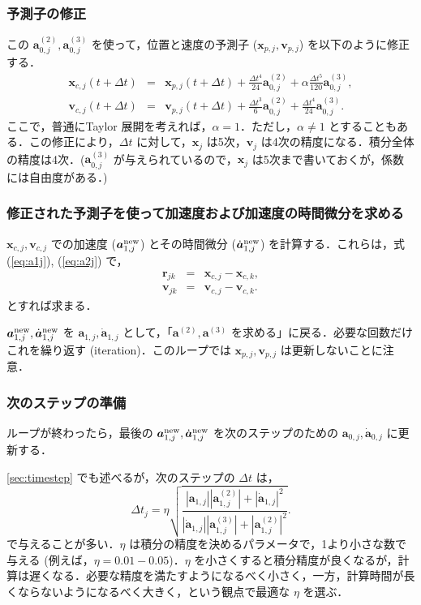 \documentclass[11pt,a4paper,oneside,onecolumn]{jreport}
\begin{document}
\subsubsection{予測子の修正}
この ${\bm a}_{0,j}^{(2)}, {\bm a}_{0,j}^{(3)}$ を使って，位置と速度の予測子 (${\bm x}_{p,j}, {\bm v}_{p,j}$) を以下のように修正する．
\begin{eqnarray}
{\bm x}_{c,j} (t + \Delta t) & = & {\bm x}_{p,j} (t + \Delta t) +  \frac{\Delta t ^4}{24} {\bm a}_{0,j}^{(2)} + \alpha \frac{\Delta t ^5}{120} {\bm a}_{0,j}^{(3)}, \\
{\bm v}_{c,j} (t + \Delta t) & = & {\bm v}_{p,j} (t +\Delta t) + \frac{\Delta t ^3}{6} {\bm a}_{0,j}^{(2)} + \frac{\Delta t ^4}{24} {\bm a}_{0,j}^{(3)}. 
\end{eqnarray}
ここで，普通にTaylor 展開を考えれば，$\alpha = 1$．ただし，$\alpha \not= 1$ とすることもある．この修正により，$\Delta t$ に対して，${\bm x}_j$ は5次，${\bm v}_j$ は4次の精度になる．積分全体の精度は4次．(${\bm a}_{0,j}^{(3)}$ が与えられているので，${\bm x}_j$ は5次まで書いておくが，係数には自由度がある．)

\subsubsection{修正された予測子を使って加速度および加速度の時間微分を求める}
${\bm x}_{c,j}, {\bm v}_{c,j}$ での加速度 (${\bm a}_{1,j}^{\rm new}$) とその時間微分 ($\dot{{\bm a}}_{1,j}^{\rm new}$) を計算する．これらは，式 (\ref{eq:a1j}), (\ref{eq:a2j}) で，
\begin{eqnarray}
{\bm r}_{jk} & = & {\bm x}_{c,j} - {\bm x}_{c,k}, \\
{\bm v}_{jk} & = & {\bm v}_{c,j} - {\bm v}_{c,k}. 
\end{eqnarray}
とすれば求まる．

${\bm a}_{1,j}^{\rm new}, \dot{{\bm a}}_{1,j}^{\rm new}$ を ${\bm a}_{1,j}, \dot{{\bm a}}_{1,j}$ として，「${\bm a}^{(2)}, {\bm a}^{(3)}$ を求める」に戻る．必要な回数だけこれを繰り返す (iteration)．このループでは ${\bm x}_{p,j}, {\bm v}_{p,j}$ は更新しないことに注意．

\subsubsection{次のステップの準備}
ループが終わったら，最後の ${\bm a}_{1,j}^{\rm new}, \dot{{\bm a}}_{1,j}^{\rm new}$ を次のステップのための ${\bm a}_{0,j}, \dot{{\bm a}}_{0,j}$ に更新する．

\ref{sec:timestep} でも述べるが，次のステップの $\Delta t$ は，
\begin{equation}
\Delta t_j = \eta \sqrt{\frac{| {\bm a}_{1,j} | | {\bm a}_{1,j}^{(2)} | + | \dot{{\bm a}}_{1,j} | ^2}{| \dot{{\bm a}}_{1,j} | | {\bm a}_{1,j}^{(3)} | + | {\bm a}_{1,j}^{(2)} | ^2}}.
\end{equation}
で与えることが多い．$\eta$ は積分の精度を決めるパラメータで，1より小さな数で与える (例えば，$\eta = 0.01 - 0.05$)．$\eta$ を小さくすると積分精度が良くなるが，計算は遅くなる．必要な精度を満たすようになるべく小さく，一方，計算時間が長くならないようになるべく大きく，という観点で最適な $\eta$ を選ぶ．
\end{document}
